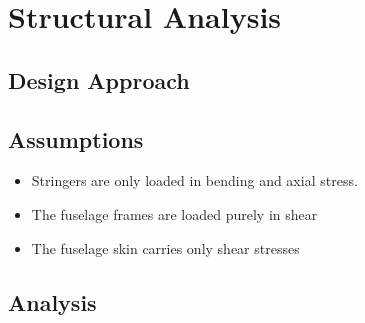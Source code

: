 \chapter{Structural Analysis}
\setlength{\parindent}{15pt}
\label{ch:stru_anal}








\section{Design Approach}
\label{sec:desi_stru}



\section{Assumptions}
\label{sec:assu_stru}

\begin{itemize}
    \item Stringers are only loaded in bending and axial stress.
    \item The fuselage frames are loaded purely in shear
    \item The fuselage skin carries only shear stresses
\end{itemize}

\section{Analysis}
\label{sec:anal_stru}

